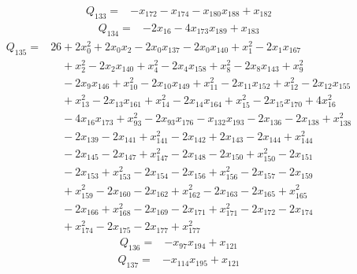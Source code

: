 \begin{equation*}\begin{split}
Q_{133}={}&-x_{172} - x_{174} - x_{180} x_{188} + x_{182}
\end{split}\end{equation*}
\begin{equation*}\begin{split}
Q_{134}={}&-2x_{16} - 4x_{173} x_{189} + x_{183}
\end{split}\end{equation*}
\begin{equation*}\begin{split}
Q_{135}={}&26 + 2x_{0}^{2} + 2x_{0} x_{2} - 2x_{0} x_{137} - 2x_{0} x_{140} + x_{1}^{2} - 2x_{1} x_{167}\\
&\quad + x_{2}^{2} - 2x_{2} x_{140} + x_{4}^{2} - 2x_{4} x_{158} + x_{8}^{2} - 2x_{8} x_{143} + x_{9}^{2}\\
&\quad -2x_{9} x_{146} + x_{10}^{2} - 2x_{10} x_{149} + x_{11}^{2} - 2x_{11} x_{152} + x_{12}^{2} - 2x_{12} x_{155}\\
&\quad + x_{13}^{2} - 2x_{13} x_{161} + x_{14}^{2} - 2x_{14} x_{164} + x_{15}^{2} - 2x_{15} x_{170} + 4x_{16}^{2}\\
&\quad -4x_{16} x_{173} + x_{93}^{2} - 2x_{93} x_{176} - x_{132} x_{193} - 2x_{136} - 2x_{138} + x_{138}^{2}\\
&\quad -2x_{139} - 2x_{141} + x_{141}^{2} - 2x_{142} + 2x_{143} - 2x_{144} + x_{144}^{2}\\
&\quad -2x_{145} - 2x_{147} + x_{147}^{2} - 2x_{148} - 2x_{150} + x_{150}^{2} - 2x_{151}\\
&\quad -2x_{153} + x_{153}^{2} - 2x_{154} - 2x_{156} + x_{156}^{2} - 2x_{157} - 2x_{159}\\
&\quad + x_{159}^{2} - 2x_{160} - 2x_{162} + x_{162}^{2} - 2x_{163} - 2x_{165} + x_{165}^{2}\\
&\quad -2x_{166} + x_{168}^{2} - 2x_{169} - 2x_{171} + x_{171}^{2} - 2x_{172} - 2x_{174}\\
&\quad + x_{174}^{2} - 2x_{175} - 2x_{177} + x_{177}^{2}
\end{split}\end{equation*}
\begin{equation*}\begin{split}
Q_{136}={}&-x_{97} x_{194} + x_{121}
\end{split}\end{equation*}
\begin{equation*}\begin{split}
Q_{137}={}&-x_{114} x_{195} + x_{121}
\end{split}\end{equation*}
